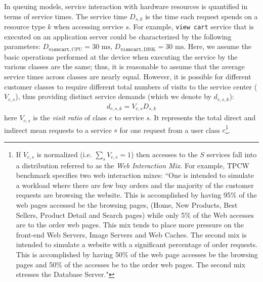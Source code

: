   In queuing models, service interaction with hardware resources is quantified  in terms of service times.  The service time $D_{s,k}$ is the time each request spends on a resource type $k$ when accessing service $s$. 
  For example, \texttt{view cart} service that is executed on an application server could be  characterized by the following  parameters: $D_{\mathtt{view cart},\text{CPU}}=30 \text{ ms}$, $D_{\mathtt{view cart},\text{DISK}}=30 \text{ ms}$. 
  Here, we assume the basic operations performed at the device when executing the service by the various  classes are the  same; thus, it is  reasonable  to  assume  that  the  average  service  times across classes are nearly equal.   
     However, it is possible for different customer classes to require different total numbers of visits to the service center ($V_{c,s}$), thus providing distinct service demands (which we denote by $d_{c,s,k}$):
     \begin{align} \label{eq:new-demands} 
       d_{c,s,k}= V_{c,s} D_{s,k} 
     \end{align}
     here $V_{c,s}$ is the \textit{visit ratio} of class $c$ to service $s$. It represents the total direct and indirect mean requests to a service $s$ for one request from a user class $c$\footnote{If $V_{c,s}$ is normalized (i.e. $\sum_s V_{c,s}=1$) then accesses to the $S$ services fall into a distribution referred to as the \textit{Web Interaction Mix}. For example, TPCW benchmark specifies two web interaction mixes: ``One is intended to simulate a workload where there are few buy orders and the majority of the customer requests are browsing the website. This is accomplished by having 95\% of the web pages accessed be the browsing pages, (Home, New Products, Best Sellers, Product Detail and Search pages) while only 5\% of the Web accesses are to the order web pages. This mix tends to place more pressure on the front-end Web Servers, Image Servers and Web Caches. The second mix is intended to simulate a website with a significant percentage of order requests. This is accomplished by having 50\% of the web page accesses be the browsing pages and 50\% of the accesses be to the order web pages. The second mix stresses the Database Server."\cite{tpcw_benchmark}}.  
